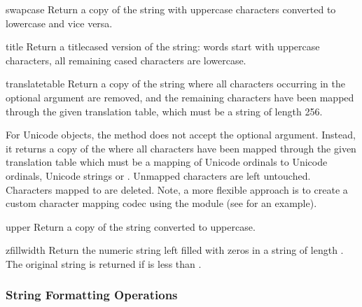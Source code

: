 \begin{methoddesc}[string]{swapcase}{}
Return a copy of the string with uppercase characters converted to
lowercase and vice versa.
\end{methoddesc}

\begin{methoddesc}[string]{title}{}
Return a titlecased version of the string: words start with uppercase
characters, all remaining cased characters are lowercase.
\end{methoddesc}

\begin{methoddesc}[string]{translate}{table}
Return a copy of the string where all characters occurring in the
optional argument  are removed, and the remaining
characters have been mapped through the given translation table, which
must be a string of length 256.

For Unicode objects, the  method does not
accept the optional  argument.  Instead, it
returns a copy of the  where all characters have been mapped
through the given translation table which must be a mapping of
Unicode ordinals to Unicode ordinals, Unicode strings or .
Unmapped characters are left untouched. Characters mapped to 
are deleted.  Note, a more flexible approach is to create a custom
character mapping codec using the  module (see
 for an example).      
\end{methoddesc}

\begin{methoddesc}[string]{upper}{}
Return a copy of the string converted to uppercase.
\end{methoddesc}

\begin{methoddesc}[string]{zfill}{width}
Return the numeric string left filled with zeros in a string
of length . The original string is returned if
 is less than .
\end{methoddesc}


\subsubsection{String Formatting Operations \label{typesseq-strings}}


